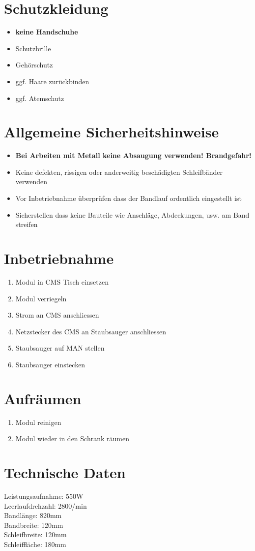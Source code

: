 \documentclass[10pt]{article}
\date{\vspace{-5ex}}
\title{\flushleft{FESTOOL Bandschleifer BS 120}}
\begin{document}
\maketitle
\thispagestyle{fancy}
\section{Schutzkleidung}
\begin{itemize}
\item \textbf{keine Handschuhe}
\item Schutzbrille
\item Gehörschutz
\item ggf. Haare zurückbinden 
\item ggf. Atemschutz 
\end{itemize}
\section{Allgemeine Sicherheitshinweise}
\begin{itemize}
\item \textbf{Bei Arbeiten mit Metall keine Absaugung verwenden! Brandgefahr!}
\item Keine defekten, rissigen oder anderweitig beschädigten Schleifbänder verwenden 
\item Vor Inbetriebnahme überprüfen dass der Bandlauf ordentlich eingestellt ist
\item Sicherstellen dass keine Bauteile wie Anschläge, Abdeckungen, usw. am Band streifen
\end{itemize}

\section{Inbetriebnahme}
\begin{enumerate}
\item Modul in CMS Tisch einsetzen
\item Modul verriegeln
\item Strom an CMS anschliessen
\item Netzstecker des CMS an Staubsauger anschliessen
\item Staubsauger auf MAN stellen
\item Staubsauger einstecken
\end{enumerate}

\section{Aufräumen}
\begin{enumerate}
\item Modul reinigen
\item Modul wieder in den Schrank räumen
\end{enumerate}

\section{Technische Daten}
Leistungsaufnahme: 550W\\
Leerlaufdrehzahl: 2800/min\\
Bandlänge: 820mm\\
Bandbreite: 120mm\\
Schleifbreite: 120mm\\
Schleiffläche: 180mm\\


\end{document}
